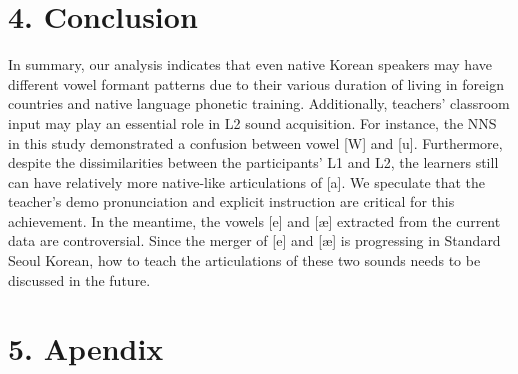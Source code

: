 \documentclass[man, fleqn, noextraspace]{apa6}
\begin{document}
\section{\texorpdfstring{\textbf{4.
Conclusion}}{4. Conclusion}}\label{conclusion}

In summary, our analysis indicates that even native Korean speakers may
have different vowel formant patterns due to their various duration of
living in foreign countries and native language phonetic training.
Additionally, teachers' classroom input may play an essential role in L2
sound acquisition. For instance, the NNS in this study demonstrated a
confusion between vowel {[}W{]} and {[}u{]}. Furthermore, despite the
dissimilarities between the participants' L1 and L2, the learners still
can have relatively more native-like articulations of {[}a{]}. We
speculate that the teacher's demo pronunciation and explicit instruction
are critical for this achievement. In the meantime, the vowels {[}e{]}
and {[}æ{]} extracted from the current data are controversial. Since the
merger of {[}e{]} and {[}æ{]} is progressing in Standard Seoul Korean,
how to teach the articulations of these two sounds needs to be discussed
in the future. \newpage

\section{\texorpdfstring{\textbf{5.
Apendix}}{5. Apendix}}\label{apendix}
\end{document}
